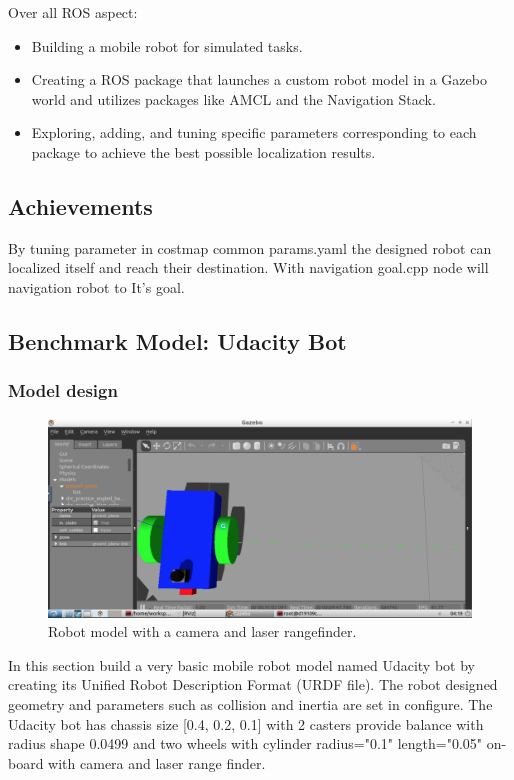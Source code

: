 \documentclass[10pt,journal,compsoc]{IEEEtran}
\begin{document}
 Over all ROS aspect:
\begin{itemize}
\item Building a mobile robot for simulated tasks.
\item Creating a ROS package that launches a custom robot model in a Gazebo world and utilizes packages like AMCL and the Navigation Stack.
\item Exploring, adding, and tuning specific parameters corresponding to each package to achieve the best possible localization results.
\end {itemize}

\subsection{Achievements}
By tuning parameter in costmap common params.yaml the designed robot can localized itself and reach their destination. With navigation goal.cpp node will navigation robot to It's goal.  

\subsection{Benchmark Model: Udacity Bot}
\subsubsection{Model design}

\begin{figure}[thpb]
      \centering
      \includegraphics[width=\linewidth]{laserrangefinder.png}
      \caption{Robot model with a camera and laser rangefinder.}
      \label{fig:robot1}
\end{figure}
In this section build a very basic mobile robot model named Udacity bot by creating its Unified Robot Description Format (URDF file). The robot designed geometry and parameters such as collision and inertia are set in configure. The Udacity bot has  chassis size [0.4, 0.2, 0.1] with 2 casters provide balance with radius shape 0.0499 and two wheels with cylinder radius="0.1" length="0.05" on-board with camera and laser range finder.
\end{document}
